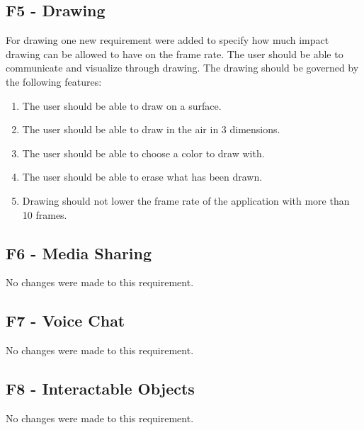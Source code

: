         \subsection{F5 - Drawing}
        For drawing one new requirement were added to specify how much impact drawing can be allowed to have on the frame rate.
        \newline\newline
        The user should be able to communicate and visualize through drawing. The drawing should be governed by the following features:
        \begin{enumerate}
            \item The user should be able to draw on a surface.
            \item The user should be able to draw in the air in 3 dimensions.
            \item The user should be able to choose a color to draw with.
            \item The user should be able to erase what has been drawn.
            \item Drawing should not lower the frame rate of the application with more than 10 frames.
        \end{enumerate}
        
        \subsection{F6 - Media Sharing}
        No changes were made to this requirement.
        
        \subsection{F7 - Voice Chat}
        No changes were made to this requirement.
        
        \subsection{F8 - Interactable Objects}
        No changes were made to this requirement.
        

